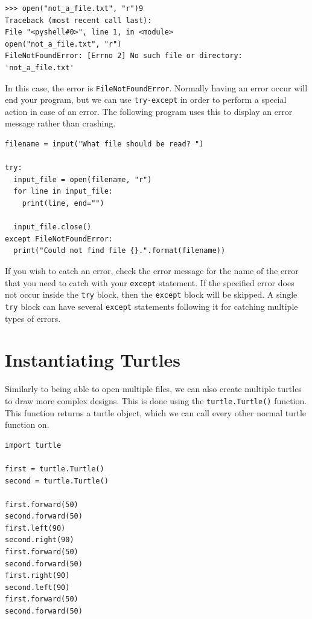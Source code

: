 \documentclass[11pt]{cselabheader}
\begin{document}
\begin{lstlisting}[style=ipython]
>>> open("not_a_file.txt", "r")9
Traceback (most recent call last):
File "<pyshell#0>", line 1, in <module>
open("not_a_file.txt", "r")
FileNotFoundError: [Errno 2] No such file or directory: 'not_a_file.txt'
\end{lstlisting}

In this case, the error is \lstinline{FileNotFoundError}. Normally having an error occur will end your program, but we can use \lstinline{try-except} in order to perform a special action in case of an error. The following program uses this to display an error message rather than crashing.

\begin{lstlisting}[style=python]
filename = input("What file should be read? ")

try:
  input_file = open(filename, "r")
  for line in input_file:
    print(line, end="")

  input_file.close()
except FileNotFoundError:
  print("Could not find file {}.".format(filename))
\end{lstlisting}

If you wish to catch an error, check the error message for the name of the error that you need to catch with your \lstinline{except} statement. If the specified error does not occur inside the \lstinline{try} block, then the \lstinline{except} block will be skipped. A single \lstinline{try} block can have several \lstinline{except} statements following it for catching multiple types of errors.


\section{Instantiating Turtles}
Similarly to being able to open multiple files, we can also create multiple turtles to draw more complex designs. This is done using the \lstinline{turtle.Turtle()} function. This function returns a turtle object, which we can call every other normal turtle function on.

\begin{lstlisting}[style=python]
import turtle

first = turtle.Turtle()
second = turtle.Turtle()

first.forward(50)
second.forward(50)
first.left(90)
second.right(90)
first.forward(50)
second.forward(50)
first.right(90)
second.left(90)
first.forward(50)
second.forward(50)
\end{lstlisting}
\end{document}

